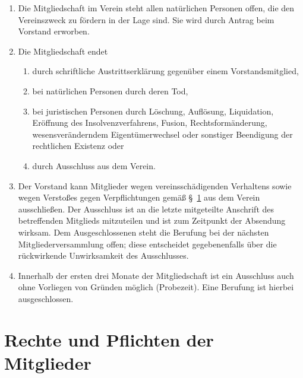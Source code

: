 \documentclass[a4paper, 10pt, headings=normal]{scrartcl}
\begin{document}
\begin{multicols}{2}
\begin{enumerate}[label={(\arabic*)}]
	\item
		Die Mitgliedschaft im Verein steht allen natürlichen Personen offen, die den Vereinszweck zu fördern in der Lage sind.
		Sie wird durch Antrag beim Vorstand erworben.
	\item
		Die Mitgliedschaft endet
		\begin{enumerate}[label={\arabic*.}]
			\item
				durch schriftliche Austrittserklärung gegenüber einem Vorstandsmitglied,
			\item
				bei natürlichen Personen durch deren Tod,
			\item
				bei juristischen Personen durch Löschung, Auflösung, Liquidation, Eröffnung des Insolvenzverfahrens, Fusion, Rechtsformänderung, wesensveränderndem Eigentümerwechsel oder sonstiger Beendigung der rechtlichen Existenz oder
			\item
				durch Ausschluss aus dem Verein.
		\end{enumerate}
	\item
		Der Vorstand kann Mitglieder wegen vereinsschädigenden Verhaltens sowie wegen Verstoßes gegen Verpflichtungen gemäß §~\ref{par:rechte-pflichten-mitglieder} aus dem Verein ausschließen.
		Der Ausschluss ist an die letzte mitgeteilte Anschrift des betreffenden Mitglieds mitzuteilen und ist zum Zeitpunkt der Absendung wirksam.
		Dem Ausgeschlossenen steht die Berufung bei der nächsten Mitgliederversammlung offen; diese entscheidet gegebenenfalls über die rückwirkende Unwirksamkeit des Ausschlusses.
	\item
		Innerhalb der ersten drei Monate der Mitgliedschaft ist ein Ausschluss auch ohne Vorliegen von Gründen möglich (Probezeit). Eine Berufung ist hierbei ausgeschlossen.
\end{enumerate}

\section{Rechte und Pflichten der Mitglieder}
\label{par:rechte-pflichten-mitglieder}


\end{multicols}
\end{document}
